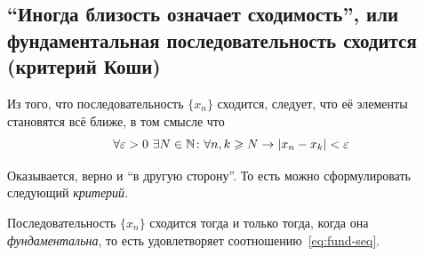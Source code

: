 \documentclass[a4paper,12pt]{article}
\begin{document}
  
  \subsection{``Иногда близость означает сходимость'', или фундаментальная последовательность сходится (критерий Коши)}
  
  Из того, что последовательность $\{x_n\}$ сходится, следует, что её элементы становятся всё ближе, в том смысле что
  \begin{equation}\label{eq:fund-seq}
    \forall \varepsilon > 0\ \exists N \in \mathbb N\colon \forall n, k \geqslant N \to |x_n - x_k| < \varepsilon
  \end{equation}
  
  Оказывается, верно и ``в другую сторону''.
  То есть можно сформулировать следующий \emph{критерий}.
  
  \begin{proposition}
    Последовательность $\{x_n\}$ сходится тогда и только тогда, когда она \emph{фундаментальна}, то есть удовлетворяет соотношению~\eqref{eq:fund-seq}.
  \end{proposition}
  
\end{document}
